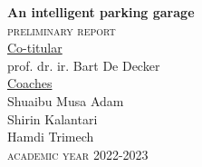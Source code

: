 \begin{titlepage}
\begin{center}
\begin{minipage}[t]{\textwidth}
\begin{center}
                \Huge{\rm\textbf{An intelligent parking garage}} \\
                \vspace{1cm}
                \large{\rm\textsc{{preliminary report}}} \\
                \vspace{4cm}
                {\rm \large\underline{Co-titular}} \\
                {\rm \normalsize{prof. dr. ir. Bart De Decker}} \\
                \vspace{0.5cm}
                {\rm \large\underline{Coaches}} \\
                {\rm \normalsize{Shuaibu Musa Adam}} \\
                {\rm \normalsize{Shirin Kalantari}} \\
                {\rm \normalsize{Hamdi Trimech}} \\
                \vspace{1.5cm}
                \LARGE{\rm\textsc{academic year 2022-2023}}
                \vfill
            \end{center}
        \end{minipage}
    \end{center}
    \vfill
\end{titlepage}
